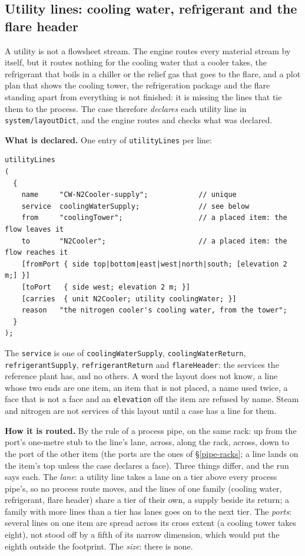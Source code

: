 \documentclass[11pt,a4paper]{article}
\begin{document}
\hypertarget{utility-lines}{%
\subsection{Utility lines: cooling water, refrigerant and the flare
header}\label{utility-lines}}\label{sec:utility-lines}

A utility is not a flowsheet stream. The engine routes every material
stream by itself, but it routes nothing for the cooling water that a
cooler takes, the refrigerant that boils in a chiller or the relief gas
that goes to the flare, and a plot plan that shows the cooling tower, the
refrigeration package and the flare standing apart from everything is
not finished: it is missing the lines that tie them to the process. The
case therefore \emph{declares} each utility line in
\texttt{system/layoutDict}, and the engine routes and checks what was
declared.

\textbf{What is declared.} One entry of \texttt{utilityLines} per line:

\begin{verbatim}
utilityLines
(
  {
    name     "CW-N2Cooler-supply";            // unique
    service  coolingWaterSupply;              // see below
    from     "coolingTower";                  // a placed item: the flow leaves it
    to       "N2Cooler";                      // a placed item: the flow reaches it
    [fromPort { side top|bottom|east|west|north|south; [elevation 2 m;] }]
    [toPort   { side west; elevation 2 m; }]
    [carries  { unit N2Cooler; utility coolingWater; }]
    reason   "the nitrogen cooler's cooling water, from the tower";
  }
);
\end{verbatim}

The \texttt{service} is one of \texttt{coolingWaterSupply},
\texttt{coolingWaterReturn}, \texttt{refrigerantSupply},
\texttt{refrigerantReturn} and \texttt{flareHeader}: the services the
reference plant has, and no others. A word the layout does not know, a
line whose two ends are one item, an item that is not placed, a name used
twice, a face that is not a face and an \texttt{elevation} off the item
are refused by name. Steam and nitrogen are not services of this layout
until a case has a line for them.

\textbf{How it is routed.} By the rule of a process pipe, on the same
rack: up from the port's one-metre stub to the line's lane, across, along
the rack, across, down to the port of the other item (the ports are the
ones of \S\ref{pipe-racks}; a line lands on the item's top unless the
case declares a face). Three things differ, and the run says each. The
\emph{lane}: a utility line takes a lane on a tier above every process
pipe's, so no process route moves, and the lines of one family (cooling
water, refrigerant, flare header) share a tier of their own, a supply
beside its return; a family with more lines than a tier has lanes goes on
to the next tier. The \emph{ports}: several lines on one item are spread
across its cross extent (a cooling tower takes eight), not stood off by a
fifth of its narrow dimension, which would put the eighth outside the
footprint. The \emph{size}: there is none.
\end{document}
